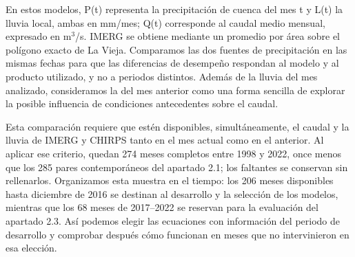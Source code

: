 \documentclass[10pt,a4paper]{article}
\begin{document}
En estos modelos, P(t) representa la precipitación de cuenca del mes t y L(t) la lluvia local, ambas en mm/mes; Q(t) corresponde al caudal medio mensual, expresado en m$^3$/s. IMERG se obtiene mediante un promedio por área sobre el polígono exacto de La Vieja. Comparamos las dos fuentes de precipitación en las mismas fechas para que las diferencias de desempeño respondan al modelo y al producto utilizado, y no a periodos distintos. Además de la lluvia del mes analizado, consideramos la del mes anterior como una forma sencilla de explorar la posible influencia de condiciones antecedentes sobre el caudal.

Esta comparación requiere que estén disponibles, simultáneamente, el caudal y la lluvia de IMERG y CHIRPS tanto en el mes actual como en el anterior. Al aplicar ese criterio, quedan 274 meses completos entre 1998 y 2022, once menos que los 285 pares contemporáneos del apartado 2.1; los faltantes se conservan sin rellenarlos. Organizamos esta muestra en el tiempo: los 206 meses disponibles hasta diciembre de 2016 se destinan al desarrollo y la selección de los modelos, mientras que los 68 meses de 2017--2022 se reservan para la evaluación del apartado 2.3. Así podemos elegir las ecuaciones con información del periodo de desarrollo y comprobar después cómo funcionan en meses que no intervinieron en esa elección.
\end{document}
